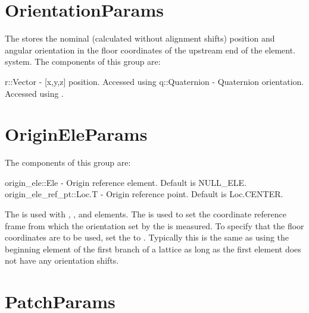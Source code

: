 \section{OrientationParams}
\label{s:orientation.g}

The  stores the nominal (calculated without alignment shifts) 
position and angular orientation in the floor coordinates of the upstream end of the element.
system. The components of this group are:
\begin{example}
  r::Vector          - [x,y,z] position. Accessed using 
  q::Quaternion      - Quaternion orientation. Accessed using .
\end{example}




\section{OriginEleParams}
\label{s:origin.ele.g}

The components of this group are:
\begin{example}
  origin_ele::Ele           - Origin reference element. Default is NULL_ELE.
  origin_ele_ref_pt::Loc.T  - Origin reference point. Default is Loc.CENTER. 
\end{example}

The  is used with , , and  elements.
The  is used to set the coordinate reference frame from which 
the orientation set by the  is measured. To specify that the floor coordinates are
to be used, set the  to . Typically this is the same as using the
beginning element of the first branch of a lattice as long as the first element does not have
any orientation shifts.


\section{PatchParams}
\label{s:patch.g}

